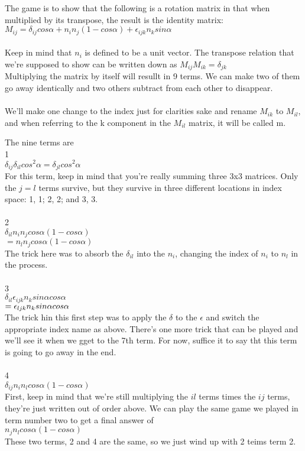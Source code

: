 \documentclass[prb,preprint]
{revtex4-1}
\begin{document}
The game is to show that the following is a rotation matrix in that when multiplied by its transpose, the result is the identity matrix:\\
$M_{ij} = \delta_{ij}cos \alpha + n_i n_j \left(1 - cos \alpha\right) + \epsilon_{ijk}n_k sin \alpha$
\\\\
Keep in mind that $n_i$ is defined to be a unit vector.  The transpose relation that we're supposed to show can be written down as $M_{ij}M_{ik} = \delta_{jk}$\\


Multiplying the matrix by itself will resullt in 9 terms.  We can make two of them go away identically and two others subtract from each other to disappear.\\\\

We'll make one change to the index just for clarities sake and rename $M_{ik}$ to $M_{il}$, and when referring to the k component in the $M_{il}$ matrix, it will be called m.

The nine terms are\\
1\\
$\delta_{ij}\delta_{il}cos^2\alpha = \delta_{jl}cos^2\alpha$\\
For this term, keep in mind that you're really summing three 3x3 matrices.  Only the $j=l$ terms survive, but they survive in three different locations in index space: 1, 1; 2, 2; and 3, 3.\\\\
2\\
$\delta_{il}n_in_j cos\alpha\left(1-cos\alpha\right)$\\
$= n_ln_j cos\alpha\left(1 - cos\alpha\right)$\\
The trick here was to absorb the $\delta_{il}$ into the $n_i$, changing the index of $n_i$ to $n_l$ in the process.\\\\
3\\
$\delta_{il}\epsilon_{ijk}n_k sin\alpha cos\alpha$\\
$=\epsilon_{ljk}n_k\space sin\alpha\space cos\alpha$\\
The trick hin this first step was to apply the $\delta$ to the $\epsilon$ and switch the appropriate index name as above.  There's one more trick that can be played and we'll see it when we gget to the 7th term.  For now, suffice it to say tht this term is going to go away in the end.\\\\
4\\
$\delta_{ij} n_i n_l cos\alpha\left(1 - cos\alpha\right)$\\
First, keep in mind that we're still multiplying the $il$ terms times the $ij$ terms, they're just written out of order above.  We can play the same game we played in term number two to get a final answer of \\
$n_j n_l cos\alpha \left(1 - cos\alpha\right)$\\
These two terms, 2 and 4 are the same, so we just wind up with 2 teims term 2.\\\\
\end{document}
